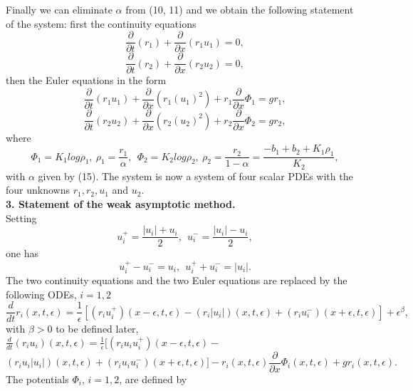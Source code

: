 \documentclass[a4paper,12pt]{article}
\begin{document}
Finally we can eliminate $\alpha$ from (10, 11) and we obtain the following statement of the system: first the continuity equations
\begin{equation}\frac{\partial}{\partial t}(r_1)+\frac{\partial}{\partial x}(r_1u_1)=0,\end{equation}
\begin{equation}\frac{\partial}{\partial t}(r_2)+\frac{\partial}{\partial x}(r_2u_2)=0,\end{equation}
 then the Euler equations in the form
\begin{equation}\frac{\partial}{\partial t}(r_1u_1)+\frac{\partial}{\partial x}(r_1(u_1)^2)+r_1\frac{\partial}{\partial x}\Phi_1=gr_1,\end{equation}
\begin{equation}\frac{\partial}{\partial t}(r_2u_2)+\frac{\partial}{\partial x}(r_2(u_2)^2)+r_2\frac{\partial}{\partial x}\Phi_2=gr_2,\end{equation}
where 
\begin{equation} \Phi_1=K_1 log \rho_1, \  \rho_1=\frac{r_1}{\alpha}, \  \  \Phi_2=K_2 log \rho_2, \
 \rho_2=\frac{r_2}{1-\alpha}=\frac{-b_1+b_2+K_1\rho_1}{K_2},\end{equation}
with $\alpha$ given by (15).
The system is now a system of four scalar PDEs with the four unknowns $r_1, r_2, u_1$ and $ u_2$.\\

\textbf{3. Statement of the weak asymptotic method.}\\
Setting 
 \begin{equation}u_i^+=\frac{|u_i|+u_i}{2}, \ \ u_i^-=\frac{|u_i|-u_i}{2},\end{equation} 
one has 
\begin{equation} u_i^+-u_i^-=u_i, \ \ u_i^++u_i^-=|u_i|. \end{equation}
The two continuity equations and the two Euler equations are replaced by the following ODEs, $i=1,2$
\begin{equation} \frac{d}{dt}r_i(x,t,\epsilon)=\frac{1}{\epsilon}[(r_i u_i^+)(x-\epsilon,t,\epsilon)-(r_i |u_i|)(x,t,\epsilon)+(r_i u_i^-)(x+\epsilon,t,\epsilon)]+\epsilon^\beta,\end{equation} with $\beta>0$ to be defined later,\\


$ \frac{d}{dt}(r_iu_i)(x,t,\epsilon)=\frac{1}{\epsilon}[(r_i u_iu_i^+)(x-\epsilon,t,\epsilon)-$\begin{equation}(r_iu_i |u_i|)(x,t,\epsilon)+(r_i u_iu_i^-)(x+\epsilon,t,\epsilon)]-r_i(x,t,\epsilon)\frac{\partial}{\partial x}\Phi_i
(x,t,\epsilon)+gr_i(x,t,\epsilon).\end{equation}
The potentials $\Phi_i$,  $i=1,2$, are defined by 
\end{document}
